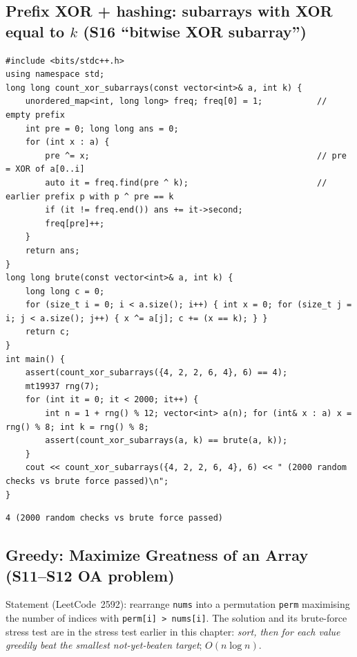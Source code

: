 \documentclass[10pt,a4paper,openany,oneside]{report}
\begin{document}
\subsection{Prefix XOR + hashing: subarrays with XOR equal to $k$ (S16 ``bitwise XOR subarray'')}
\begin{lstlisting}[language={[11]C++}]
#include <bits/stdc++.h>
using namespace std;
long long count_xor_subarrays(const vector<int>& a, int k) {
    unordered_map<int, long long> freq; freq[0] = 1;           // empty prefix
    int pre = 0; long long ans = 0;
    for (int x : a) {
        pre ^= x;                                              // pre = XOR of a[0..i]
        auto it = freq.find(pre ^ k);                          // earlier prefix p with p ^ pre == k
        if (it != freq.end()) ans += it->second;
        freq[pre]++;
    }
    return ans;
}
long long brute(const vector<int>& a, int k) {
    long long c = 0;
    for (size_t i = 0; i < a.size(); i++) { int x = 0; for (size_t j = i; j < a.size(); j++) { x ^= a[j]; c += (x == k); } }
    return c;
}
int main() {
    assert(count_xor_subarrays({4, 2, 2, 6, 4}, 6) == 4);
    mt19937 rng(7);
    for (int it = 0; it < 2000; it++) {
        int n = 1 + rng() % 12; vector<int> a(n); for (int& x : a) x = rng() % 8; int k = rng() % 8;
        assert(count_xor_subarrays(a, k) == brute(a, k));
    }
    cout << count_xor_subarrays({4, 2, 2, 6, 4}, 6) << " (2000 random checks vs brute force passed)\n";
}
\end{lstlisting}
\begin{lstlisting}[style=out,title={Answer: captured output}]
4 (2000 random checks vs brute force passed)
\end{lstlisting}

\subsection{Greedy: Maximize Greatness of an Array (S11--S12 OA problem)}
Statement (LeetCode~2592): rearrange \texttt{nums} into a permutation \texttt{perm} maximising the number of indices with \texttt{perm[i] > nums[i]}. The solution and its brute-force stress test are in the stress test earlier in this chapter: \emph{sort, then for each value greedily beat the smallest not-yet-beaten target}; $O(n\log n)$.
\end{document}
